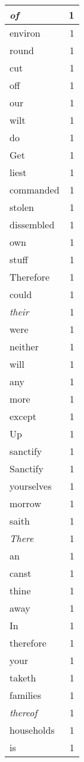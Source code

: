\begin{center}
\begin{longtable}{l|r}
\emph{of} & 1\\ \hline 
environ & 1\\ \hline 
round & 1\\ \hline 
cut & 1\\ \hline 
off & 1\\ \hline 
our & 1\\ \hline 
wilt & 1\\ \hline 
do & 1\\ \hline 
Get & 1\\ \hline 
liest & 1\\ \hline 
commanded & 1\\ \hline 
stolen & 1\\ \hline 
dissembled & 1\\ \hline 
own & 1\\ \hline 
stuff & 1\\ \hline 
Therefore & 1\\ \hline 
could & 1\\ \hline 
\emph{their} & 1\\ \hline 
were & 1\\ \hline 
neither & 1\\ \hline 
will & 1\\ \hline 
any & 1\\ \hline 
more & 1\\ \hline 
except & 1\\ \hline 
Up & 1\\ \hline 
sanctify & 1\\ \hline 
Sanctify & 1\\ \hline 
yourselves & 1\\ \hline 
morrow & 1\\ \hline 
saith & 1\\ \hline 
\emph{There} & 1\\ \hline 
an & 1\\ \hline 
canst & 1\\ \hline 
thine & 1\\ \hline 
away & 1\\ \hline 
In & 1\\ \hline 
therefore & 1\\ \hline 
your & 1\\ \hline 
taketh & 1\\ \hline 
families & 1\\ \hline 
\emph{thereof} & 1\\ \hline 
households & 1\\ \hline 
is & 1\\ \hline 

\end{longtable}
\end{center}
